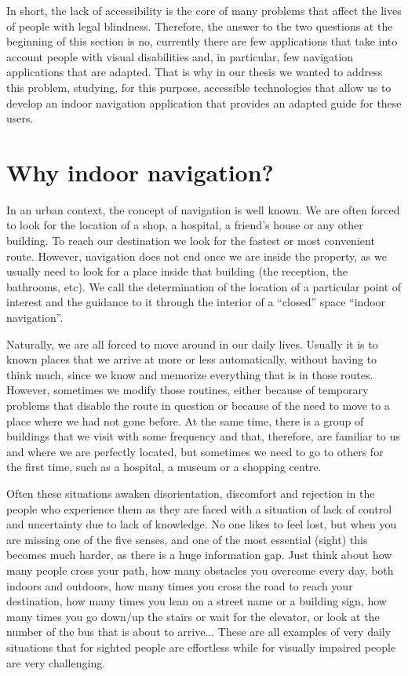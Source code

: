 In short, the lack of accessibility is the core of many problems that affect the lives of people with legal blindness. Therefore, the answer to the two questions at the beginning of this section is no, currently there are few applications that take into account people with visual disabilities and, in particular, few navigation applications that are adapted. That is why in our thesis we wanted to address this problem, studying, for this purpose, accessible technologies that allow us to develop an indoor navigation application that provides an adapted guide for these users.

\section{Why indoor navigation?}
\label{sec:motivation}

In an urban context, the concept of navigation is well known. We are often forced to look for the location of a shop, a hospital, a friend's house or any other building. To reach our destination we look for the fastest or most convenient route. However, navigation does not end once we are inside the property, as we usually need to look for a place inside that building (the reception, the bathrooms, etc). We call the determination of the location of a particular point of interest and the guidance to it through the interior of a ``closed'' space ``indoor navigation''.

Naturally, we are all forced to move around in our daily lives. Usually it is to known places that we arrive at more or less automatically, without having to think much, since we know and memorize everything that is in those routes. However, sometimes we modify those routines, either because of temporary problems that disable the route in question or because of the need to move to a place where we had not gone before. At the same time, there is a group of buildings that we visit with some frequency and that, therefore, are familiar to us and where we are perfectly located, but sometimes we need to go to others for the first time, such as a hospital, a museum or a shopping centre. 

Often these situations awaken disorientation, discomfort and rejection in the people who experience them as they are faced with a situation of lack of control and uncertainty due to lack of knowledge. No one likes to feel lost, but when you are missing one of the five senses, and one of the most essential (sight) this becomes much harder, as there is a huge information gap. Just think about how many people cross your path, how many obstacles you overcome every day, both indoors and outdoors, how many times you cross the road to reach your destination, how many times you lean on a street name or a building sign, how many times you go down/up the stairs or wait for the elevator, or look at the number of the bus that is about to arrive... These are all examples of very daily situations that for sighted people are effortless while for visually impaired people are very challenging. 

